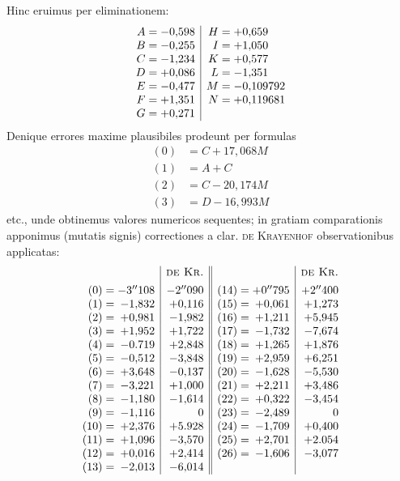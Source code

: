 Hinc eruimus per eliminationem:
\[
\begin{array}{r@{\;}c@{\;}l|r@{\;}c@{\;}l}
A&=&-0{,}598&H&=&+0{,}659\\
B&=&-0{,}255&I&=&+1{,}050\\
C&=&-1{,}234&K&=&+0{,}577\\
D&=&+0{,}086&L&=&-1{,}351\\
E&=&-0{,}477&M&=&-0{,}109792\\
F&=&+1{,}351&N&=&+0{,}119681\\
G&=&+0{,}271&&&
\end{array}
\]
Denique errores maxime plausibiles prodeunt per formulas
\[
\begin{aligned}
(0)&=C+17{,}068M\\
(1)&=A+C\\
(2)&=C-20{,}174M\\
(3)&=D-16{,}993M
\end{aligned}
\]
etc., unde obtinemus valores numericos sequentes; in gratiam comparationis apponimus (mutatis signis) correctiones a clar. \textsc{de Krayenhof} observationibus applicatas:
\[
\begin{array}{r@{\;}c@{\;}r|r||r@{\;}c@{\;}r|r}
&&&\text{\textsc{de Kr.}}&&&&\text{\textsc{de Kr.}}\\[4pt]
(0)&=&-3''108&-2''090&(14)&=&+0''795&+2''400\\
(1)&=&-1{,}832&+0{,}116&(15)&=&+0{,}061&+1{,}273\\
(2)&=&+0{,}981&-1{,}982&(16)&=&+1{,}211&+5{,}945\\
(3)&=&+1{,}952&+1{,}722&(17)&=&-1{,}732&-7{,}674\\
(4)&=&-0.719&+2{,}848&(18)&=&+1{,}265&+1{,}876\\
(5)&=&-0{,}512&-3{,}848&(19)&=&+2{,}959&+6{,}251\\
(6)&=&+3{,}648&-0{,}137&(20)&=&-1{,}628&-5{,}530\\
(7)&=&-3{,}221&+1{,}000&(21)&=&+2{,}211&+3{,}486\\
(8)&=&-1{,}180&-1{,}614&(22)&=&+0{,}322&-3{,}454\\
(9)&=&-1{,}116&0&(23)&=&-2{,}489&0\\
(10)&=&+2{,}376&+5.928&(24)&=&-1{,}709&+0{,}400\\
(11)&=&+1{,}096&-3{,}570&(25)&=&+2{,}701&+2.054\\
(12)&=&+0{,}016&+2{,}414&(26)&=&-1{,}606&-3{,}077\\
(13)&=&-2{,}013&-6{,}014&&&&
\end{array}
\]

